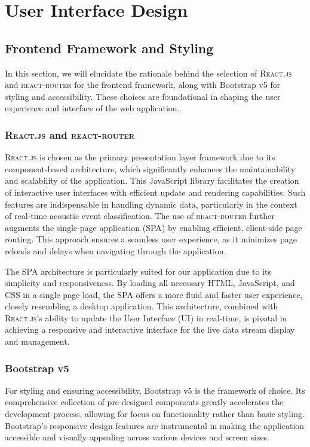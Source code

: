 \section{User Interface Design}



\subsection{Frontend Framework and Styling}
In this section, we will elucidate the rationale behind the selection of \textsc{React.js} and \textsc{react-router} for the frontend framework, along with Bootstrap v5 for styling and accessibility. These choices are foundational in shaping the user experience and interface of the web application.

\subsubsection{\textsc{React.js} and \textsc{react-router}}
\textsc{React.js}\cite{reactReact} is chosen as the primary presentation layer framework due to its component-based architecture, which significantly enhances the maintainability and scalability of the application. This JavaScript library facilitates the creation of interactive user interfaces with efficient update and rendering capabilities. Such features are indispensable in handling dynamic data, particularly in the context of real-time acoustic event classification. The use of \textsc{react-router}\cite{reactrouterHomeV6190} further augments the single-page application (SPA) by enabling efficient, client-side page routing. This approach ensures a seamless user experience, as it minimizes page reloads and delays when navigating through the application.

The SPA architecture is particularly suited for our application due to its simplicity and responsiveness. By loading all necessary HTML, JavaScript, and CSS in a single page load, the SPA offers a more fluid and faster user experience, closely resembling a desktop application. This architecture, combined with \textsc{React.js}'s ability to update the User Interface (UI) in real-time, is pivotal in achieving a responsive and interactive interface for the live data stream display and management.

\subsubsection{Bootstrap v5}
For styling and ensuring accessibility, Bootstrap v5 is the framework of choice. Its comprehensive collection of pre-designed components greatly accelerates the development process, allowing for focus on functionality rather than basic styling. Bootstrap’s responsive design features are instrumental in making the application accessible and visually appealing across various devices and screen sizes.

